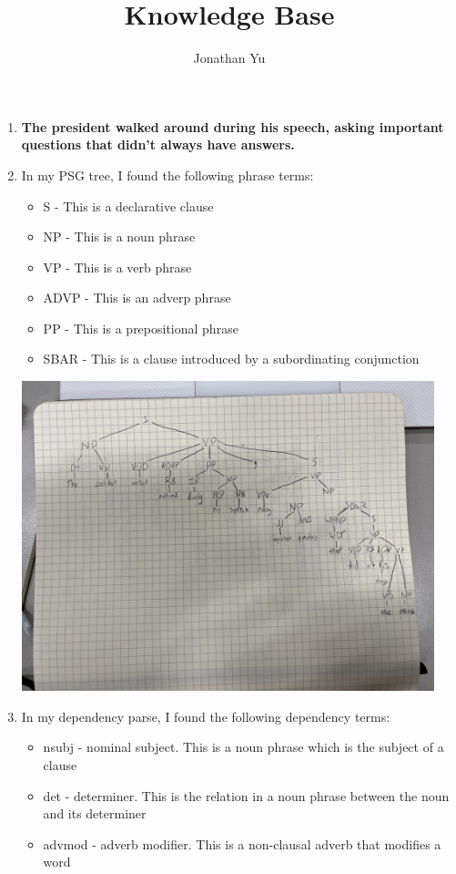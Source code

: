 \documentclass{article}
\title{Knowledge Base}
\author{Jonathan Yu}
\begin{document}
\renewcommand{\arraystretch}{1.5}
\maketitle
\begin{enumerate}
	\item \textbf{The president walked around during his speech, asking important questions that didn't always have answers.}
	\item In my PSG tree, I found the following phrase terms:
		\begin{itemize}
			\item S - This is a declarative clause
			\item NP - This is a noun phrase
			\item VP - This is a verb phrase
			\item ADVP - This is an adverp phrase
			\item PP - This is a prepositional phrase
			\item SBAR - This is a clause introduced by a subordinating conjunction
		\end{itemize}
		\includegraphics[width=12cm]{IMG-1534.jpg}
	\item In my dependency parse, I found the following dependency terms:
		\begin{itemize}
			\item nsubj - nominal subject. This is a noun phrase which is the subject of a clause
			\item det - determiner. This is the relation in a noun phrase between the noun and its determiner
			\item advmod - adverb modifier. This is a non-clausal adverb that modifies a word

\end{itemize}
\end{enumerate}
\end{document}
